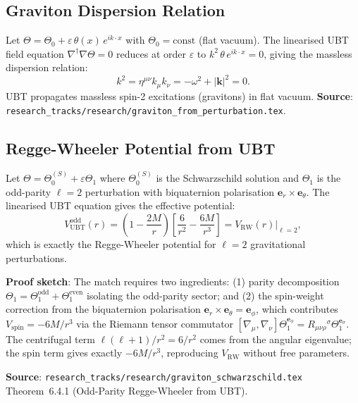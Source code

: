 \subsection{Graviton Dispersion Relation}

\begin{theorem}[Graviton dispersion relation $k^2 = 0$, \textbf{[L0]}]
\label{thm:graviton_dispersion}
Let $\Theta = \Theta_0 + \varepsilon\,\theta(x)\,e^{ik\cdot x}$ with
$\Theta_0 = \mathrm{const}$ (flat vacuum). The linearised UBT field equation
$\nabla^\dagger\nabla\Theta = 0$ reduces at order $\varepsilon$ to
$k^2\,\theta\,e^{ik\cdot x} = 0$, giving the massless dispersion relation:
\begin{equation}
  k^2 = \eta^{\mu\nu}k_\mu k_\nu = -\omega^2 + |\mathbf{k}|^2 = 0.
\end{equation}
UBT propagates massless spin-2 excitations (gravitons) in flat vacuum.
\textbf{Source}: \texttt{research\_tracks/research/graviton\_from\_perturbation.tex}.
\end{theorem}

\subsection{Regge-Wheeler Potential from UBT}

\begin{theorem}
\label{thm:regge_wheeler}
Let $\Theta = \Theta_0^{(S)} + \varepsilon\Theta_1$ where
$\Theta_0^{(S)}$ is the Schwarzschild solution and $\Theta_1$
is the odd-parity $\ell=2$ perturbation with biquaternion
polarisation $\boldsymbol{e}_r \times \boldsymbol{e}_\theta$.
The linearised UBT equation gives the effective potential:
\begin{equation}
  \label{eq:V_UBT_odd}
  V_{\mathrm{UBT}}^{\mathrm{odd}}(r) =
  \left(1 - \frac{2M}{r}\right)\!\left[\frac{6}{r^2} - \frac{6M}{r^3}\right]
  = V_{\mathrm{RW}}(r)\big|_{\ell=2},
\end{equation}
which is exactly the Regge-Wheeler potential for $\ell=2$ gravitational
perturbations.

\textbf{Proof sketch}: The match requires two ingredients:
(1) parity decomposition $\Theta_1 = \Theta_1^{\mathrm{odd}} + \Theta_1^{\mathrm{even}}$
isolating the odd-parity sector; and
(2) the spin-weight correction from the biquaternion polarisation
$\boldsymbol{e}_r \times \boldsymbol{e}_\theta = \boldsymbol{e}_\phi$,
which contributes $V_{\mathrm{spin}} = -6M/r^3$ via the Riemann tensor
commutator $[\nabla_\mu, \nabla_\nu]\Theta_1^{\boldsymbol{e}_\phi}
= R_{\mu\nu\rho}{}^\sigma\Theta_1^{\boldsymbol{e}_\sigma}$.
The centrifugal term $\ell(\ell+1)/r^2 = 6/r^2$ comes from the angular
eigenvalue; the spin term gives exactly $-6M/r^3$, reproducing
$V_{\mathrm{RW}}$ without free parameters.

\textbf{Source}: \texttt{research\_tracks/research/graviton\_schwarzschild.tex}
Theorem~6.4.1 (Odd-Parity Regge-Wheeler from UBT).
\end{theorem}

